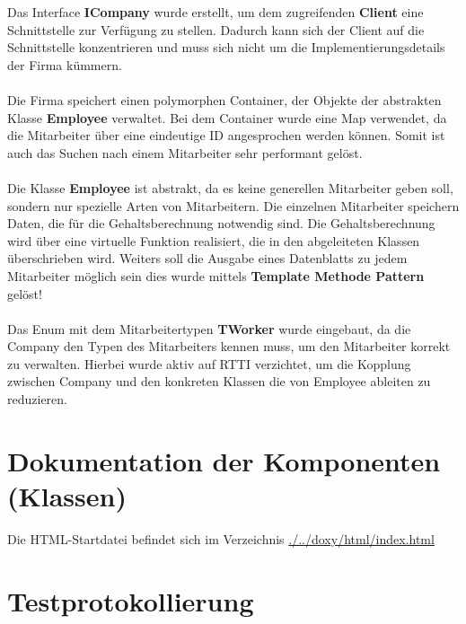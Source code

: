 \documentclass[12pt,naustrian,a4widepaper]{scrartcl}
\begin{document}
Das Interface \textbf{ICompany} wurde erstellt, um dem zugreifenden \textbf{Client} eine Schnittstelle zur Verfügung zu stellen.
Dadurch kann sich der Client auf die Schnittstelle konzentrieren und muss sich nicht um die Implementierungsdetails der Firma kümmern.
\\
\\
Die Firma speichert einen polymorphen Container, der Objekte der abstrakten Klasse \textbf{Employee} verwaltet.
Bei dem Container wurde eine Map verwendet, da die Mitarbeiter über eine eindeutige ID angesprochen werden können.
Somit ist auch das Suchen nach einem Mitarbeiter sehr performant gelöst.
\\
\\
Die Klasse \textbf{Employee} ist abstrakt, da es keine generellen Mitarbeiter geben soll, sondern nur spezielle Arten von Mitarbeitern.
Die einzelnen Mitarbeiter speichern Daten, die für die Gehaltsberechnung notwendig sind. 
Die Gehaltsberechnung wird über eine virtuelle Funktion realisiert, die in den abgeleiteten Klassen überschrieben wird.
Weiters soll die Ausgabe eines Datenblatts zu jedem Mitarbeiter möglich sein dies wurde mittels \textbf{Template Methode Pattern} gelöst!
\\
\\
Das Enum mit dem Mitarbeitertypen \textbf{TWorker} wurde eingebaut, da die Company den Typen des Mitarbeiters kennen muss, um den Mitarbeiter korrekt zu verwalten.
Hierbei wurde aktiv auf RTTI verzichtet, um die Kopplung zwischen Company und den konkreten Klassen die von Employee ableiten zu reduzieren.

\color{black}

\section{Dokumentation der Komponenten (Klassen)}
Die HTML-Startdatei befindet sich im Verzeichnis \href{run:./../doxy/html/index.html}{./../doxy/html/index.html}


\clearpage
\section{Testprotokollierung}

\end{document}
